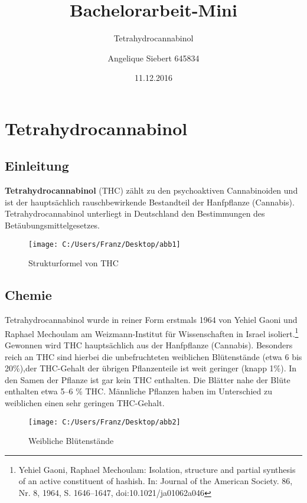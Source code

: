 \documentclass[openany]{scrbook}
\title{Bachelorarbeit-Mini}
\subtitle{Tetrahydrocannabinol}
\author{Angelique Siebert 645834}
\date{11.12.2016}
\begin{document}
	\maketitle
	\tableofcontents

	\chapter
	{Tetrahydrocannabinol}
	\section{Einleitung}
	\textbf{Tetrahydrocannabinol} (THC) zählt zu den psychoaktiven Cannabinoiden und ist der hauptsächlich rauschbewirkende Bestandteil der Hanfpflanze (Cannabis). Tetrahydrocannabinol unterliegt in Deutschland den Bestimmungen des Betäubungsmittelgesetzes.
	
\begin{figure}[h]
	\centering
	\texttt{[image: C:/Users/Franz/Desktop/abb1]}
	\caption{Strukturformel von THC}
	\label{fig:THC}
\end{figure}

\section{Chemie}
	Tetrahydrocannabinol wurde in reiner Form erstmals 1964 von Yehiel Gaoni und Raphael Mechoulam am Weizmann-Institut für Wissenschaften in Israel isoliert.\footnote[1]{ Yehiel Gaoni, Raphael Mechoulam: Isolation, structure and partial synthesis of an active constituent of hashish. In: Journal of the American Society. 86, Nr. 8, 1964, S. 1646–1647, doi:10.1021/ja01062a046} Gewonnen wird THC hauptsächlich aus der Hanfpflanze (Cannabis). Besonders reich an THC sind hierbei die unbefruchteten weiblichen Blütenstände (etwa 6 bis 20\%),der THC-Gehalt der übrigen Pflanzenteile ist weit geringer (knapp 1\%). In den Samen der Pflanze ist gar kein THC enthalten. Die Blätter nahe der Blüte enthalten etwa 5–6 \% THC. Männliche Pflanzen haben im Unterschied zu weiblichen einen sehr geringen THC-Gehalt. 
	
\begin{figure}[h]
	\centering
	\texttt{[image: C:/Users/Franz/Desktop/abb2]}
	\caption{Weibliche Blütenstände}
	\label{fig:Fe}
\end{figure}
\end{document}
